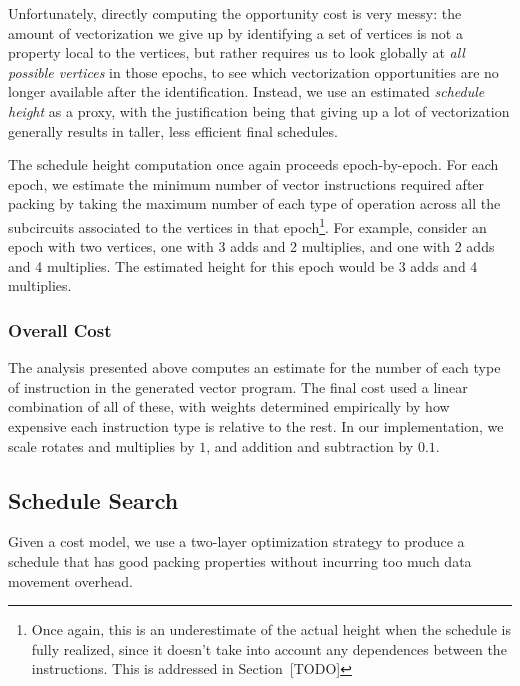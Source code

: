Unfortunately, directly computing the opportunity cost is very messy: the amount of vectorization we give up by identifying a set of vertices is not a property local to the vertices, but rather requires us to look globally at {\em all possible vertices} in those epochs, to see which vectorization opportunities are no longer available after the identification.
Instead, we use an estimated {\em schedule height} as a proxy, with the justification being that giving up a lot of vectorization generally results in taller, less efficient final schedules. 

The schedule height computation once again proceeds epoch-by-epoch.
For each epoch, we estimate the minimum number of vector instructions required after packing by taking the maximum number of each type of operation across all the subcircuits associated to the vertices in that epoch\footnote{Once again, this is an underestimate of the actual height when the schedule is fully realized, since it doesn't take into account any dependences between the instructions. This is addressed in Section~[TODO]}.
For example, consider an epoch with two vertices, one with 3 adds and 2 multiplies, and one with 2 adds and 4 multiplies.
The estimated height for this epoch would be 3 adds and 4 multiplies.

\subsubsection*{Overall Cost}
The analysis presented above computes an estimate for the number of each type of instruction in the generated vector program.
The final cost used a linear combination of all of these, with weights determined empirically by how expensive each instruction type is relative to the rest.
In our implementation, we scale rotates and multiplies by $1$, and addition and subtraction by $0.1$. 

\subsection{Schedule Search}
Given a cost model, we use a two-layer optimization strategy to produce a schedule that has good packing properties without incurring too much data movement overhead.
